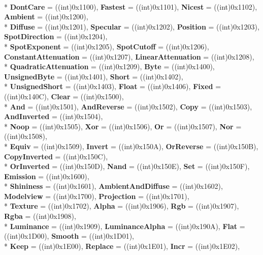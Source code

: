 \begin{DoxyCompactItemize}
\\*
{\bfseries Dont\-Care} = ((int)0x1100), 
{\bfseries Fastest} = ((int)0x1101), 
{\bfseries Nicest} = ((int)0x1102), 
{\bfseries Ambient} = ((int)0x1200), 
\\*
{\bfseries Diffuse} = ((int)0x1201), 
{\bfseries Specular} = ((int)0x1202), 
{\bfseries Position} = ((int)0x1203), 
{\bfseries Spot\-Direction} = ((int)0x1204), 
\\*
{\bfseries Spot\-Exponent} = ((int)0x1205), 
{\bfseries Spot\-Cutoff} = ((int)0x1206), 
{\bfseries Constant\-Attenuation} = ((int)0x1207), 
{\bfseries Linear\-Attenuation} = ((int)0x1208), 
\\*
{\bfseries Quadratic\-Attenuation} = ((int)0x1209), 
{\bfseries Byte} = ((int)0x1400), 
{\bfseries Unsigned\-Byte} = ((int)0x1401), 
{\bfseries Short} = ((int)0x1402), 
\\*
{\bfseries Unsigned\-Short} = ((int)0x1403), 
{\bfseries Float} = ((int)0x1406), 
{\bfseries Fixed} = ((int)0x140\-C), 
{\bfseries Clear} = ((int)0x1500), 
\\*
{\bfseries And} = ((int)0x1501), 
{\bfseries And\-Reverse} = ((int)0x1502), 
{\bfseries Copy} = ((int)0x1503), 
{\bfseries And\-Inverted} = ((int)0x1504), 
\\*
{\bfseries Noop} = ((int)0x1505), 
{\bfseries Xor} = ((int)0x1506), 
{\bfseries Or} = ((int)0x1507), 
{\bfseries Nor} = ((int)0x1508), 
\\*
{\bfseries Equiv} = ((int)0x1509), 
{\bfseries Invert} = ((int)0x150\-A), 
{\bfseries Or\-Reverse} = ((int)0x150\-B), 
{\bfseries Copy\-Inverted} = ((int)0x150\-C), 
\\*
{\bfseries Or\-Inverted} = ((int)0x150\-D), 
{\bfseries Nand} = ((int)0x150\-E), 
{\bfseries Set} = ((int)0x150\-F), 
{\bfseries Emission} = ((int)0x1600), 
\\*
{\bfseries Shininess} = ((int)0x1601), 
{\bfseries Ambient\-And\-Diffuse} = ((int)0x1602), 
{\bfseries Modelview} = ((int)0x1700), 
{\bfseries Projection} = ((int)0x1701), 
\\*
{\bfseries Texture} = ((int)0x1702), 
{\bfseries Alpha} = ((int)0x1906), 
{\bfseries Rgb} = ((int)0x1907), 
{\bfseries Rgba} = ((int)0x1908), 
\\*
{\bfseries Luminance} = ((int)0x1909), 
{\bfseries Luminance\-Alpha} = ((int)0x190\-A), 
{\bfseries Flat} = ((int)0x1\-D00), 
{\bfseries Smooth} = ((int)0x1\-D01), 
\\*
{\bfseries Keep} = ((int)0x1\-E00), 
{\bfseries Replace} = ((int)0x1\-E01), 
{\bfseries Incr} = ((int)0x1\-E02), 

\end{DoxyCompactItemize}
